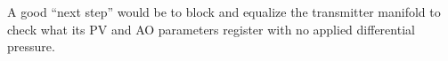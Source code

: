\vskip 10pt

A good ``next step'' would be to block and equalize the transmitter manifold to check what its PV and AO parameters register with no applied differential pressure.











